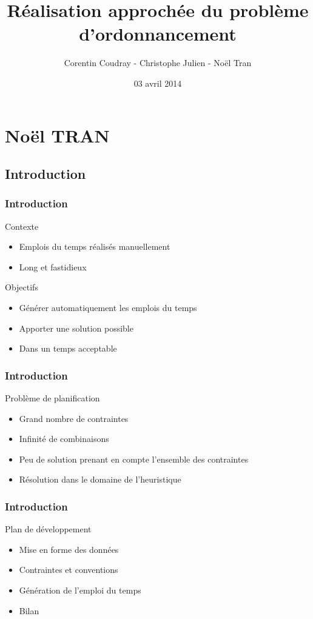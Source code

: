 \documentclass{beamer}
\title{Réalisation approchée du problème d'ordonnancement}
\author{Corentin Coudray - Christophe Julien - Noël Tran}
\institute{ESME SUDRIA}
\date{03 avril 2014}
\begin{document}
\begin{frame}
\titlepage
\end{frame}
\section{Noël TRAN}
\subsection{Introduction}
\begin{frame}
\frametitle{Introduction}
\begin{block}{Contexte}
\begin{itemize}
\item Emplois du temps réalisés manuellement
\item Long et fastidieux\\
\end{itemize}
\end{block}

\begin{block}{Objectifs}
\begin{itemize}
\item Générer automatiquement les emplois du temps
\item Apporter une solution possible
\item Dans un temps acceptable
\end{itemize}
\end{block}
\end{frame}

\begin{frame}
\frametitle{Introduction}
\begin{block}{Problème de planification}
\begin{itemize}
\item Grand nombre de contraintes
\item Infinité de combinaisons
\item Peu de solution prenant en compte l'ensemble des contraintes
\item Résolution dans le domaine de l'heuristique
\end{itemize}
\end{block}
\end{frame}

\begin{frame}
\frametitle{Introduction}
\begin{block}{Plan de développement}
\begin{itemize}
\item Mise en forme des données
\item Contraintes et conventions
\item Génération de l'emploi du temps
\item Bilan
\end{itemize}
\end{block}
\end{frame}
\end{document}
